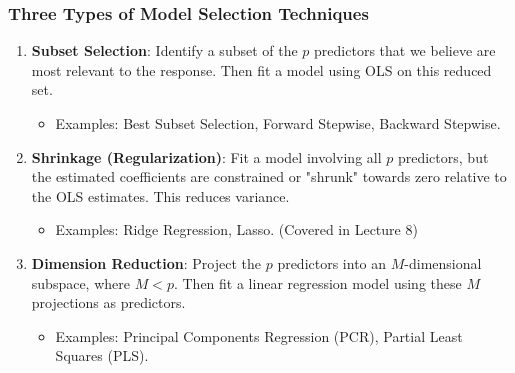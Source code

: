 \documentclass[12pt,a4paper]{article}
\begin{document}
\begin{itemize}
\begin{itemize}
\begin{itemize}
    \subsubsection{Three Types of Model Selection Techniques }
        \begin{enumerate}
            \item \textbf{Subset Selection}: Identify a subset of the $p$ predictors that we believe are most relevant to the response. Then fit a model using OLS on this reduced set.
                \begin{itemize}
                    \item Examples: Best Subset Selection, Forward Stepwise, Backward Stepwise.
                \end{itemize}
            \item \textbf{Shrinkage (Regularization)}: Fit a model involving all $p$ predictors, but the estimated coefficients are constrained or "shrunk" towards zero relative to the OLS estimates. This reduces variance.
                \begin{itemize}
                    \item Examples: Ridge Regression, Lasso. (Covered in Lecture 8)
                \end{itemize}
            \item \textbf{Dimension Reduction}: Project the $p$ predictors into an $M$-dimensional subspace, where $M < p$. Then fit a linear regression model using these $M$ projections as predictors.
                \begin{itemize}
                    \item Examples: Principal Components Regression (PCR), Partial Least Squares (PLS).
                \end{itemize}
        \end{enumerate}


\end{itemize}
\end{itemize}
\end{itemize}
\end{document}
